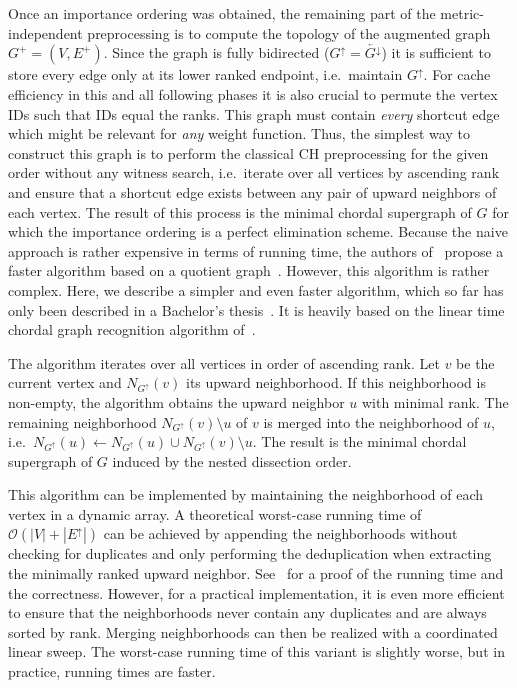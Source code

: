 \documentclass[a4paper, english, cleveref]{lipics-v2021}
\newcommand*{\gchu}{G^{\uparrow}}
\newcommand*{\rgchd}{\overleftarrow{G^{\downarrow}}}
\newcommand*{\echu}{E^{\uparrow}}
\begin{document}
Once an importance ordering was obtained, the remaining part of the metric-independent preprocessing is to compute the topology of the augmented graph $G^+=(V, E^+)$.
Since the graph is fully bidirected ($\gchu = \rgchd$) it is sufficient to store every edge only at its lower ranked endpoint, i.e.\ maintain $\gchu$.
For cache efficiency in this and all following phases it is also crucial to permute the vertex IDs such that IDs equal the ranks.
This graph must contain \emph{every} shortcut edge which might be relevant for \emph{any} weight function.
Thus, the simplest way to construct this graph is to perform the classical CH preprocessing for the given order without any witness search, i.e.\ iterate over all vertices by ascending rank and ensure that a shortcut edge exists between any pair of upward neighbors of each vertex.
The result of this process is the minimal chordal supergraph of $G$ for which the importance ordering is a perfect elimination scheme.
Because the naive approach is rather expensive in terms of running time, the authors of~\cite{DibbeltSW16} propose a faster algorithm based on a quotient graph~\cite{TODO}.
However, this algorithm is rather complex.
Here, we describe a simpler and even faster algorithm, which so far has only been described in a Bachelor's thesis~\cite{TODO}.
It is heavily based on the linear time chordal graph recognition algorithm of~\cite{TODO}.

The algorithm iterates over all vertices in order of ascending rank.
Let $v$ be the current vertex and $N_{\gchu}(v)$ its upward neighborhood.
If this neighborhood is non-empty, the algorithm obtains the upward neighbor $u$ with minimal rank.
The remaining neighborhood $N_{\gchu}(v) \setminus u$ of $v$ is merged into the neighborhood of $u$, i.e.\ $N_{\gchu}(u) \gets N_{\gchu}(u) \cup N_{\gchu}(v) \setminus u$.
The result is the minimal chordal supergraph of $G$ induced by the nested dissection order.

This algorithm can be implemented by maintaining the neighborhood of each vertex in a dynamic array.
A theoretical worst-case running time of $\mathcal{O}(|V| + |\echu|)$ can be achieved by appending the neighborhoods without checking for duplicates and only performing the deduplication when extracting the minimally ranked upward neighbor.
See~\cite{TODO} for a proof of the running time and the correctness.
However, for a practical implementation, it is even more efficient to ensure that the neighborhoods never contain any duplicates and are always sorted by rank.
Merging neighborhoods can then be realized with a coordinated linear sweep.
The worst-case running time of this variant is slightly worse, but in practice, running times are faster.
\end{document}
